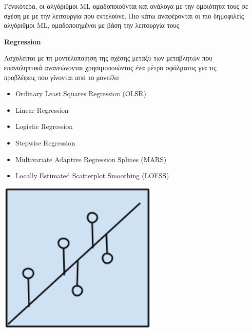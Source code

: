 Γενικότερα, οι αλγόριθμοι ML ομαδοποιούνται και ανάλογα με την ομοιότητα τους
σε σχέση με με την λειτουργία που εκτελούνε. Πιο κάτω αναφέρονται οι πιο δημοφιλείς
αλγόριθμοι ML, ομαδοποιημένοι με βάση την λειτουργία τους
\\

\begin{minipage}{0.5\textwidth}

  \textbf{\large Regression}

  Aσχολείται με τη μοντελοποίηση της σχέσης μεταξύ των μεταβλητών που επαναληπτικά ανανεώνονται
  χρησιμοποιώντας ένα μέτρο σφάλματος για τις προβλέψεις που γίνονται από το μοντέλο
  \begin{itemize}
    \setlength\itemsep{0em}
    \item{Ordinary Least Squares Regression (OLSR)}
    \item{Linear Regression}
    \item{Logistic Regression}
    \item{Stepwise Regression}
    \item{Multivariate Adaptive Regression Splines (MARS)}
    \item{Locally Estimated Scatterplot Smoothing (LOESS)}
  \end{itemize}
\end{minipage}
\begin{minipage}{0.5\textwidth}
  \begin{center}
    \includegraphics[width=0.6\textwidth]{./images/chapter3/regression_algorithms.png}
  \end{center}
\end{minipage}


